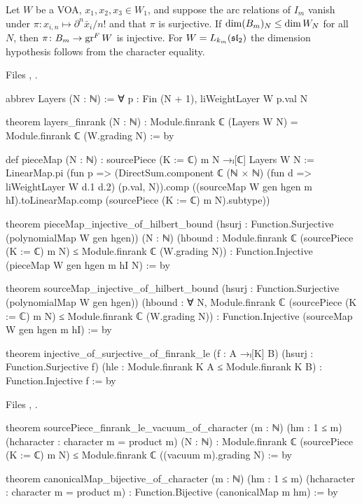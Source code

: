 \begin{theorem}\label{l20:thm:squeeze}
Let $W$ be a VOA, $x_1,x_2,x_3\in W_1$, and suppose the arc relations of $I_m$ vanish under
$\pi\colon x_{i,n}\mapsto\partial^n\bar x_i/n!$ and that $\pi$ is surjective. If
$\dim(B_m)_N\le\dim W_N$ for all $N$, then $\pi\colon B_m\to\operatorname{gr}^F W$ is injective. For
$W=L_{k_m}(\mathfrak{sl}_2)$ the dimension hypothesis follows from the character equality.
\end{theorem}
\noindent Files ,
.
\begin{leancode}
abbrev Layers (N : ℕ) := ∀ p : Fin (N + 1), liWeightLayer W p.val N

theorem layers_finrank (N : ℕ) :
    Module.finrank ℂ (Layers W N) = Module.finrank ℂ (W.grading N) := by

def pieceMap (N : ℕ) : sourcePiece (K := ℂ) m N →ₗ[ℂ] Layers W N :=
  LinearMap.pi (fun p =>
    (DirectSum.component ℂ (ℕ × ℕ) (fun d => liWeightLayer W d.1 d.2) (p.val, N)).comp
      ((sourceMap W gen hgen m hI).toLinearMap.comp (sourcePiece (K := ℂ) m N).subtype))

theorem pieceMap_injective_of_hilbert_bound
    (hsurj : Function.Surjective (polynomialMap W gen hgen)) (N : ℕ)
    (hbound : Module.finrank ℂ (sourcePiece (K := ℂ) m N) ≤
      Module.finrank ℂ (W.grading N)) :
    Function.Injective (pieceMap W gen hgen m hI N) := by

theorem sourceMap_injective_of_hilbert_bound
    (hsurj : Function.Surjective (polynomialMap W gen hgen))
    (hbound : ∀ N, Module.finrank ℂ (sourcePiece (K := ℂ) m N) ≤
      Module.finrank ℂ (W.grading N)) :
    Function.Injective (sourceMap W gen hgen m hI) := by

theorem injective_of_surjective_of_finrank_le
    (f : A →ₗ[K] B) (hsurj : Function.Surjective f)
    (hle : Module.finrank K A ≤ Module.finrank K B) :
    Function.Injective f := by
\end{leancode}
\noindent Files ,
.
\begin{leancode}
theorem sourcePiece_finrank_le_vacuum_of_character (m : ℕ) (hm : 1 ≤ m)
    (hcharacter : character m = product m) (N : ℕ) :
    Module.finrank ℂ (sourcePiece (K := ℂ) m N) ≤
      Module.finrank ℂ ((vacuum m).grading N) := by

theorem canonicalMap_bijective_of_character (m : ℕ) (hm : 1 ≤ m)
    (hcharacter : character m = product m) :
    Function.Bijective (canonicalMap m hm) := by
\end{leancode}

